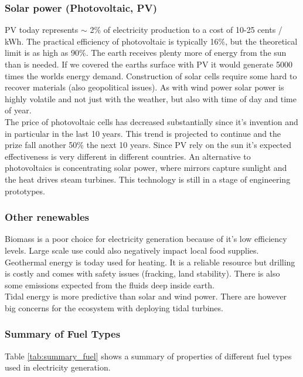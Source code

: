 \subsubsection{Solar power (Photovoltaic, PV)}
PV today represents $\sim$ 2\% of electricity production to a cost of 10-25 cents / kWh.
The practical efficiency of photovoltaic is typically 16\%, but the theoretical limit is as high as 90\%.
The earth receives plenty more of energy from the sun than is needed. If we covered the earths surface with PV it would generate 5000 times the worlds energy demand.
Construction of solar cells require some hard to recover materials (also geopolitical issues).
As with wind power solar power is highly volatile and not just with the weather, but also with time of day and time of year.\\

The price of photovoltaic cells has decreased substantially since it's invention and in particular in the last 10 years. This trend is projected to continue and the prize fall another 50\% the next 10 years.
Since PV rely on the sun it's expected effectiveness is very different in different countries.
An alternative to photovoltaics is concentrating solar power, where mirrors capture sunlight and the heat drives steam turbines. This technology is still in a stage of engineering prototypes.

\subsubsection{Other renewables}
Biomass is a poor choice for electricity generation because of it's low efficiency levels. Large scale use could also negatively impact local food supplies.\\

Geothermal energy is today used for heating.
It is a reliable resource but drilling is costly and comes with safety issues (fracking, land stability).
There is also some \cotwo emissions expected from the fluids deep inside earth.\\

Tidal energy is more predictive than solar and wind power. There are however big concerns for the ecosystem with deploying tidal turbines.

\subsubsection{Summary of Fuel Types}
Table \ref{tab:summary_fuel} shows a summary of properties of different fuel types used in electricity generation.

